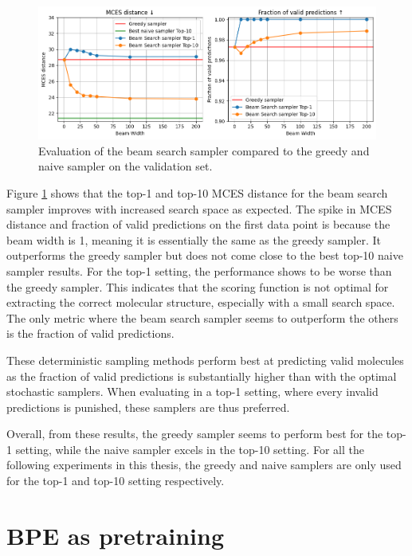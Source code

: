 \begin{figure}[h]
    \centering
    \includegraphics[width=1.0\textwidth]{figures/results/samplers/beam_search.png}
    \caption{Evaluation of the beam search sampler compared to the greedy and naive sampler on the validation set.}
    \label{fig:beam-search}
\end{figure}

Figure \ref{fig:beam-search} shows that the top-1 and top-10 MCES distance for the beam search sampler improves with increased search space as expected.
The spike in MCES distance and fraction of valid predictions on the first data point is because the beam width is 1, meaning it is essentially the same as the greedy sampler.
It outperforms the greedy sampler but does not come close to the best top-10 naive sampler results. 
For the top-1 setting, the performance shows to be worse than the greedy sampler.
This indicates that the scoring function is not optimal for extracting the correct molecular structure, especially with a small search space.
The only metric where the beam search sampler seems to outperform the others is the fraction of valid predictions.

These deterministic sampling methods perform best at predicting valid molecules as the fraction of valid predictions is substantially higher than with the optimal stochastic samplers.
When evaluating in a top-1 setting, where every invalid predictions is punished, these samplers are thus preferred.

Overall, from these results, the greedy sampler seems to perform best for the top-1 setting, while the naive sampler excels in the top-10 setting.
For all the following experiments in this thesis, the greedy and naive samplers are only used for the top-1 and top-10 setting respectively.

\section{\ac{BPE} as pretraining}

